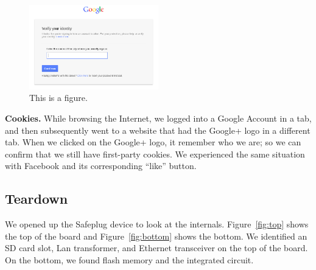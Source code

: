 \begin{figure}[htb]
\begin{center}
\includegraphics[width=0.5\textwidth]{funnygoogle}
\caption{This is a figure.}
\label{fig:funnygoogle}
\end{center}
\end{figure}

{\bf Cookies.}  While browsing the Internet, we logged into a Google Account in a tab, and then subsequently went to a website that had the Google+ logo in a different tab.  When we clicked on the Google+ logo, it remember who we are; so we can confirm that we still have first-party cookies.  We experienced the same situation with Facebook and its corresponding ``like'' button.

\subsection{Teardown}
\label{sec:tear}
We opened up the Safeplug device to look at the internals.  Figure~\ref{fig:top} shows the top of the board and Figure~\ref{fig:bottom} shows the bottom.  We identified an SD card slot, Lan transformer, and Ethernet transceiver on the top of the board.  On the bottom, we found flash memory and the integrated circuit.

